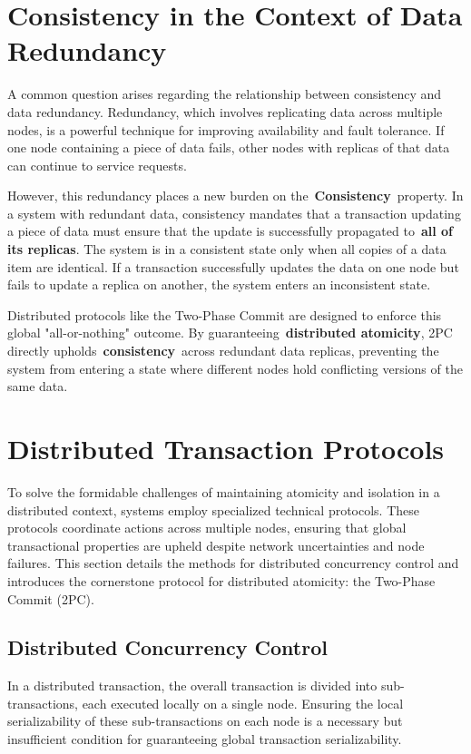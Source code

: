 \documentclass{scrbook}
\begin{document}
\section{Consistency in the Context of Data Redundancy}

A common question arises regarding the relationship between consistency
and data redundancy. Redundancy, which involves replicating data across
multiple nodes, is a powerful technique for improving availability and
fault tolerance. If one node containing a piece of data fails, other
nodes with replicas of that data can continue to service requests.

However, this redundancy places a new burden on
the~\textbf{Consistency}~property. In a system with redundant data,
consistency mandates that a transaction updating a piece of data must
ensure that the update is successfully propagated to~\textbf{all of its
replicas}. The system is in a consistent state only when all copies of a
data item are identical. If a transaction successfully updates the data
on one node but fails to update a replica on another, the system enters
an inconsistent state.

Distributed protocols like the Two-Phase Commit are designed to enforce
this global "all-or-nothing" outcome. By
guaranteeing~\textbf{distributed atomicity}, 2PC directly
upholds~\textbf{consistency}~across redundant data replicas, preventing
the system from entering a state where different nodes hold conflicting
versions of the same data.

\section{Distributed Transaction Protocols}

To solve the formidable challenges of maintaining atomicity and
isolation in a distributed context, systems employ specialized technical
protocols. These protocols coordinate actions across multiple nodes,
ensuring that global transactional properties are upheld despite network
uncertainties and node failures. This section details the methods for
distributed concurrency control and introduces the cornerstone protocol
for distributed atomicity: the Two-Phase Commit (2PC).

\subsection{Distributed Concurrency Control}

In a distributed transaction, the overall transaction is divided into
sub-transactions, each executed locally on a single node. Ensuring the
local serializability of these sub-transactions on each node is a
necessary but insufficient condition for guaranteeing global transaction
serializability.
\end{document}
